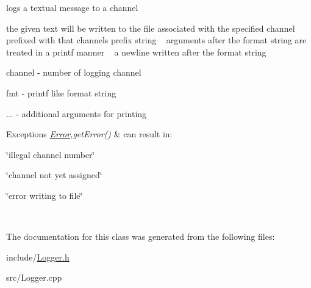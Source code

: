 logs a textual message to a channel 

the given text will be written to the file associated with the specified channel prefixed with that channels prefix string ~\newline
arguments after the format string are treated in a printf manner ~\newline
a newline written after the format string

\begin{DoxyItemize}
\item {\ttfamily channel} -\/ number of logging channel \item {\ttfamily fmt} -\/ printf like format string \item {\ttfamily }... -\/ additional arguments for printing\end{DoxyItemize}

\begin{DoxyExceptions}{Exceptions}
{\em \hyperlink{classError}{Error},get\+Error()} & can result in\+:
\begin{DoxyItemize}
\item \char`\"{}illegal channel number\char`\"{}
\item \char`\"{}channel not yet assigned\char`\"{}
\item \char`\"{}error writing to file\char`\"{} 
\end{DoxyItemize}\\
\hline
\end{DoxyExceptions}


The documentation for this class was generated from the following files\+:\begin{DoxyCompactItemize}
\item 
include/\hyperlink{Logger_8h}{Logger.\+h}\item 
src/Logger.\+cpp\end{DoxyCompactItemize}
